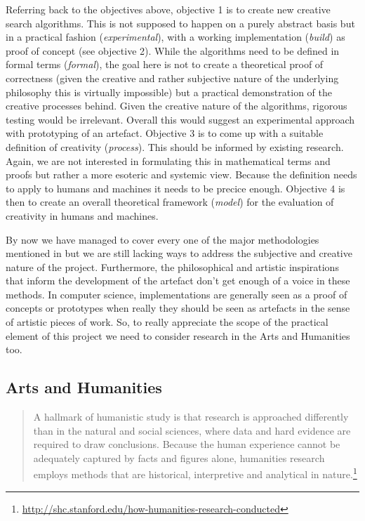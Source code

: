 Referring back to the objectives above, objective 1 is to create new creative search algorithms. This is not supposed to happen on a purely abstract basis but in a practical fashion (\emph{experimental}), with a working implementation (\emph{build}) as proof of concept (see objective 2). While the algorithms need to be defined in formal terms (\emph{formal}), the goal here is not to create a theoretical proof of correctness (given the creative and rather subjective nature of the underlying philosophy this is virtually impossible) but a practical demonstration of the creative processes behind. Given the creative nature of the algorithms, rigorous testing would be irrelevant. Overall this would suggest an experimental approach with prototyping of an artefact. Objective 3 is to come up with a suitable definition of creativity (\emph{process}). This should be informed by existing research. Again, we are not interested in formulating this in mathematical terms and proofs but rather a more esoteric and systemic view. Because the definition needs to apply to humans and machines it needs to be precice enough. Objective 4 is then to create an overall theoretical framework (\emph{model}) for the evaluation of creativity in humans and machines.

By now we have managed to cover every one of the major methodologies mentioned in \autocite{Amaral} but we are still lacking ways to address the subjective and creative nature of the project. Furthermore, the philosophical and artistic inspirations that inform the development of the artefact don't get enough of a voice in these methods. In computer science, implementations are generally seen as a proof of concepts or prototypes when really they should be seen as artefacts in the sense of artistic pieces of work. So, to really appreciate the scope of the practical element of this project we need to consider research in the Arts and Humanities too.


\subsection{Arts and Humanities}



\begin{quotation}
  A hallmark of humanistic study is that research is approached differently than in the natural and social sciences, where data and hard evidence are required to draw conclusions. Because the human experience cannot be adequately captured by facts and figures alone, humanities research employs methods that are historical, interpretive and analytical in nature.\footnote{\url{http://shc.stanford.edu/how-humanities-research-conducted}}
\end{quotation}

